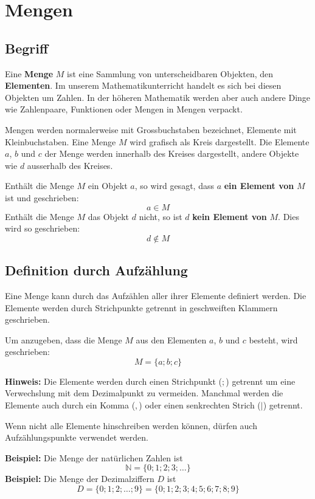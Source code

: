\newpage
\section{Mengen}

\subsection{Begriff}
Eine \textbf{Menge} $M$ ist eine Sammlung von unterscheidbaren Objekten, den \textbf{Elementen}. Im unserem Mathematikunterricht handelt es sich bei diesen Objekten um Zahlen. In der höheren Mathematik werden aber auch andere Dinge wie Zahlenpaare, Funktionen oder Mengen in Mengen verpackt.

Mengen werden normalerweise mit Grossbuchstaben bezeichnet, Elemente mit Kleinbuchstaben. Eine Menge $M$ wird grafisch als Kreis dargestellt. Die Elemente $a$, $b$  und $c$ der Menge werden innerhalb des Kreises dargestellt, andere Objekte wie $d$ ausserhalb des Kreises.
\begin{center}
\end{center}
Enthält die Menge $M$ ein Objekt $a$, so wird gesagt, dass $a$ \textbf{ein Element von} $M$ ist und geschrieben:
\[
  a \in M
\]
Enthält die Menge $M$ das Objekt $d$ nicht, so ist $d$ \textbf{kein Element von} $M$. Dies wird so geschrieben:
\[
  d \notin M
\]

\subsection{Definition durch Aufzählung}
Eine Menge kann durch das Aufzählen aller ihrer Elemente definiert werden. Die Elemente werden durch Strichpunkte getrennt in geschweiften Klammern geschrieben.

Um anzugeben, dass die Menge $M$ aus den Elementen $a$, $b$ und $c$ besteht, wird geschrieben:
\[
  M = \{ a; b; c \}
\]
\begin{note}
\textbf{Hinweis:} Die Elemente werden durch einen Strichpunkt ($;$) getrennt um eine Verwechslung mit dem Dezimalpunkt zu vermeiden. Manchmal werden die Elemente auch durch ein Komma ($,$) oder einen senkrechten Strich ($|$) getrennt.
\end{note}
Wenn nicht alle Elemente hinschreiben werden können, dürfen auch Aufzählungspunkte verwendet werden.
\begin{example}
  \textbf{Beispiel:}  Die Menge der natürlichen Zahlen ist
  \[
    \mathbb{N} = \{0; 1; 2; 3;\ldots \}
  \]
  \textbf{Beispiel:} Die Menge der Dezimalziffern $D$ ist
  \[
    D = \{ 0; 1; 2; \ldots ; 9 \} = \{ 0;1;2;3;4;5;6;7;8;9 \}
  \]
\end{example}

